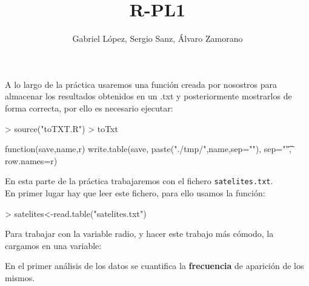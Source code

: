 \documentclass [a4paper] {article}
\title{R-PL1}
\author{Gabriel L\'opez, Sergio Sanz, \'Alvaro Zamorano}
\begin{document}
\maketitle

A lo largo de la pr\'actica usaremos una funci\'on creada por nosostros para almacenar los resultados obtenidos en un .txt y posteriormente
mostrarlos de forma correcta, por ello es necesario ejecutar:
\begin{Schunk}
\begin{Sinput}
> source("toTXT.R")
> toTxt
\end{Sinput}
\begin{Soutput}
function(save,name,r) {
    write.table(save, paste("./tmp/",name,sep=""), sep="\t", row.names=r) 
}
\end{Soutput}
\end{Schunk}

\graphicspath{ {./tmp/} }

En esta parte de la pr\'actica trabajaremos con el fichero
\texttt{satelites.txt}.\\

\bigskip
En primer lugar hay que leer este fichero, para ello usamos
la funci\'on:
\begin{Schunk}
\begin{Sinput}
> satelites<-read.table("satelites.txt")
\end{Sinput}
\end{Schunk}

\bigskip
Para trabajar con la variable radio, y hacer este trabajo m\'as
c\'omodo, la cargamos en una variable:
\begin{Schunk}
\end{Schunk}

\bigskip
En el primer an\'alisis de los datos se cuantifica la \textbf{frecuencia}
de aparici\'on de los mismos. 
\end{document}
